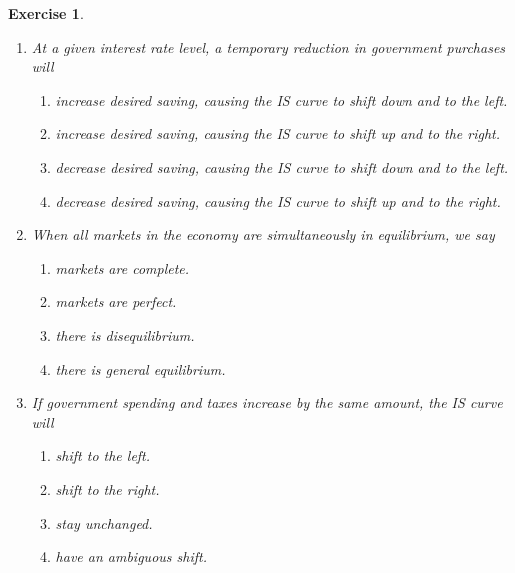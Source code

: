 \documentclass[12pt]{article}
\newtheorem{exercise}{Exercise}
\begin{document}
\begin{exercise}
    \begin{enumerate}[label=(\arabic*)]
        \item At a given interest rate level, a temporary reduction in government purchases will
        \begin{enumerate}[label=\Alph*.]
            \item increase desired saving, causing the IS curve to shift down and to the left.
            \item increase desired saving, causing the IS curve to shift up and to the right.
            \item decrease desired saving, causing the IS curve to shift down and to the left.
            \item decrease desired saving, causing the IS curve to shift up and to the right.
        \end{enumerate}
        \item When all markets in the economy are simultaneously in equilibrium, we say
        \begin{enumerate}[label=\Alph*.]
            \item markets are complete.
            \item markets are perfect.
            \item there is disequilibrium.
            \item there is general equilibrium.
        \end{enumerate}
        \item If government spending and taxes increase by the same amount, the IS curve will
        \begin{enumerate}[label=\Alph*.]
            \item shift to the left.
            \item shift to the right.
            \item stay unchanged.
            \item have an ambiguous shift.
        \end{enumerate}
    \end{enumerate}
\end{exercise}
\end{document}
